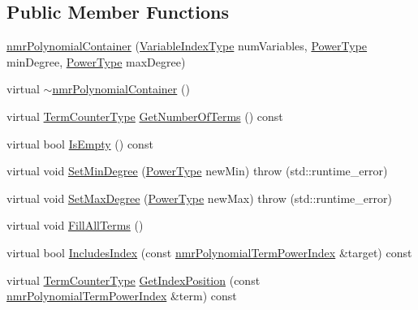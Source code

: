 \subsection*{Public Member Functions}
\begin{DoxyCompactItemize}
\item 
\hyperlink{classnmr_polynomial_container_a64d893a4d10133f60228dfe6572c4207}{nmr\+Polynomial\+Container} (\hyperlink{classnmr_polynomial_base_aae95477e451ddc7d3ee3f41cbdaadde2}{Variable\+Index\+Type} num\+Variables, \hyperlink{classnmr_polynomial_base_a58607c884bf2e6725a77ed4d9e14ba26}{Power\+Type} min\+Degree, \hyperlink{classnmr_polynomial_base_a58607c884bf2e6725a77ed4d9e14ba26}{Power\+Type} max\+Degree)
\item 
virtual \hyperlink{classnmr_polynomial_container_a8a8e9cbcf9b278f74ca644a2be8773c5}{$\sim$nmr\+Polynomial\+Container} ()
\item 
virtual \hyperlink{classnmr_polynomial_base_a4b0abd66b12b6f5bfb30d0eb1607e661}{Term\+Counter\+Type} \hyperlink{classnmr_polynomial_container_a155c42ad638239ba889ca69739287e85}{Get\+Number\+Of\+Terms} () const 
\item 
virtual bool \hyperlink{classnmr_polynomial_container_afec06d447808f6751b9e28b168a4ff60}{Is\+Empty} () const 
\item 
virtual void \hyperlink{classnmr_polynomial_container_a0f2a6cb8aca5e95073051de89973ab56}{Set\+Min\+Degree} (\hyperlink{classnmr_polynomial_base_a58607c884bf2e6725a77ed4d9e14ba26}{Power\+Type} new\+Min)  throw (std\+::runtime\+\_\+error)
\item 
virtual void \hyperlink{classnmr_polynomial_container_ac54f6c4d7ba690d4b103f051853a61b6}{Set\+Max\+Degree} (\hyperlink{classnmr_polynomial_base_a58607c884bf2e6725a77ed4d9e14ba26}{Power\+Type} new\+Max)  throw (std\+::runtime\+\_\+error)
\item 
virtual void \hyperlink{classnmr_polynomial_container_a0f42d97bb5e37df22b3b940177c05823}{Fill\+All\+Terms} ()
\item 
virtual bool \hyperlink{classnmr_polynomial_container_ad8e23eba5aab3f5cf0f153c054fe7b8a}{Includes\+Index} (const \hyperlink{classnmr_polynomial_term_power_index}{nmr\+Polynomial\+Term\+Power\+Index} \&target) const 
\item 
virtual \hyperlink{classnmr_polynomial_base_a4b0abd66b12b6f5bfb30d0eb1607e661}{Term\+Counter\+Type} \hyperlink{classnmr_polynomial_container_a1ea223fdd9f483c32fed3eb91d880cec}{Get\+Index\+Position} (const \hyperlink{classnmr_polynomial_term_power_index}{nmr\+Polynomial\+Term\+Power\+Index} \&term) const 

\end{DoxyCompactItemize}
